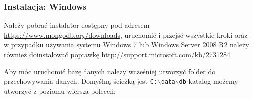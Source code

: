 \documentclass{beamer}
\begin{document}
  \begin{frame}
    \frametitle{Instalacja: Windows}
	Należy pobrać instalator dostępny pod adresem \url{https://www.mongodb.org/downloads}, uruchomić i przejść wszystkie kroki oraz w przypadku używania systemu Windows 7 lub Windows Server 2008 R2 należy również doinstalować poprawkę \url{http://support.microsoft.com/kb/2731284}
	
	Aby móc uruchomić bazę danych należy wcześniej utworzyć folder do przechowywania danych. Domyślną ścieżką jest \texttt{C:$\backslash$data$\backslash$db} katalog możemy utworzyć z poziomu wiersza poleceń:
	
	 
  \end{frame}
\end{document}

